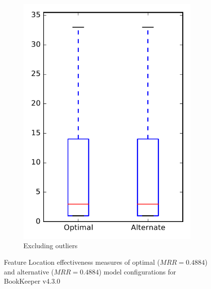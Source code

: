 \begin{figure}
\begin{subfigure}{.4\textwidth}
        \includegraphics[height=0.4\textheight]{figures/combo/flt_rq1_bookkeeper_no_outlier}
        \caption{Excluding outliers}\label{fig:combo:flt:rq1:bookkeeper_no_outlier}
    \end{subfigure}
\caption{Feature Location effectiveness measures of optimal ($MRR=0.4884$) and alternative ($MRR=0.4884$) model configurations for BookKeeper v4.3.0}
\label{fig:combo:flt:rq1:bookkeeper}
\end{figure}
